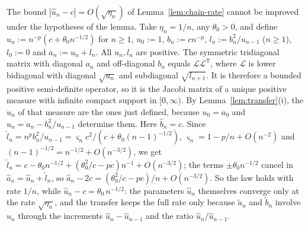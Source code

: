 \begin{remark}\label{rem:sharp}
The bound $|\hat u_n-c|=O(\sqrt{\eta_n})$ of Lemma~\ref{lem:chain-rate} cannot be improved under the hypotheses of the
lemma. Take $\eta_n=1/n$, any $\theta_0>0$, and define $u_n:=n^{-p}(c+\theta_0 n^{-1/2})$ for $n\ge1$, $u_0:=1$,
$b_n:=cn^{-p}$, $l_n:=b_n^2/u_{n-1}$ ($n\ge1$), $l_0:=0$ and $a_n:=u_n+l_n$. All $u_n,l_n$ are positive. The symmetric
tridiagonal matrix with diagonal $a_n$ and off-diagonal $b_n$ equals $\mathcal L\mathcal L^{\mathsf T}$, where
$\mathcal L$ is lower bidiagonal with diagonal $\sqrt{u_n}$ and subdiagonal $\sqrt{l_{n+1}}$. It is therefore a bounded
positive semi-definite operator, so it is the Jacobi matrix of a unique positive measure with infinite compact support
in $[0,\infty)$. By Lemma~\ref{lem:transfer}(i), the $u_n$ of that measure are the ones just defined, because
$u_0=a_0$ and $u_n=a_n-b_n^2/u_{n-1}$ determine them. Here $\hat b_n=c$. Since
$\hat l_n=n^pb_n^2/u_{n-1}=\varsigma_nc^2/(c+\theta_0(n-1)^{-1/2})$, $\varsigma_n=1-p/n+O(n^{-2})$ and
$(n-1)^{-1/2}=n^{-1/2}+O(n^{-3/2})$, we get $\hat l_n=c-\theta_0n^{-1/2}+(\theta_0^2/c-pc)n^{-1}+O(n^{-3/2})$; the
terms $\pm\theta_0n^{-1/2}$ cancel in $\hat a_n=\hat u_n+\hat l_n$, so $\hat a_n-2c=(\theta_0^2/c-pc)/n+O(n^{-3/2})$.
So the law holds with rate $1/n$, while $\hat u_n-c=\theta_0\,n^{-1/2}$: the parameters $\hat u_n$ themselves converge
only at the rate $\sqrt{\eta_n}$, and the transfer keeps the full rate only because $\tilde a_n$ and $\tilde b_n$
involve $\hat u_n$ through the increments $\hat u_n-\hat u_{n-1}$ and the ratio $\hat u_n/\hat u_{n-1}$.
\end{remark}
